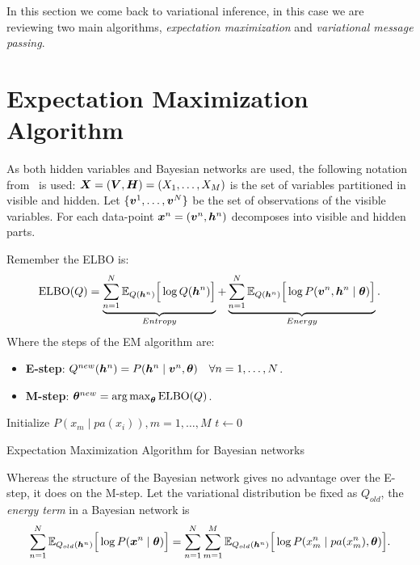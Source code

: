 
In this section we come back to variational inference, in this case we are reviewing two main algorithms, \emph{expectation maximization} and \emph{variational message passing}.


\section{Expectation Maximization Algorithm}

As both hidden variables and Bayesian networks are used, the following notation from~\cite{barber} is used: \(\bm{X} = (\bm{V}, \bm{H}) = (X_{1}, \dots , X_{M})\) is the set of variables partitioned in visible and hidden. Let \(\{\bm{v}^{1}, \dots, \bm{v}^{N}\}\) be the set of observations of the visible variables. For each data-point \(\bm{x}^{n} = (\bm{v}^{n}, \bm{h}^{n})\) decomposes into visible and hidden parts.

Remember the ELBO is:
\[
  \text{ELBO}(Q) = \underbrace{\sum_{n=1}^{N}\mathbb{E}_{Q(\bm{h}^{n})}\Big[\log{Q(\bm{h}^{n})}\Big]}_{Entropy} + \underbrace{\sum_{n=1}^{N}\mathbb{E}_{Q(\bm{h}^{n})}\Big[\log{P(\bm{v}^{n}, \bm{h}^{n} \mid \bm{\theta})}\Big]}_{Energy}.
\]
Where the steps of the EM algorithm are:
\begin{itemize}
  \item \textbf{E-step}:  \(Q^{new}(\bm{h}^{n}) = P(\bm{h}^{n} \mid \bm{v}^{n} , \bm{\theta}) \quad \forall n=1,\dots,N\).
  \item \textbf{M-step}: \(\bm{\theta}^{new} = \operatorname*{arg\,max}_{\bm{\theta}} \text{ELBO}(Q)\).
\end{itemize}

\begin{algorithm}[ht]
  \SetAlgoLined{}
  Initialize \( P(x_{m}\mid pa(x_{i})), m=1,\dots,M \)\;
  \(t \leftarrow 0\)\;
  \;
  \caption{Expectation Maximization Algorithm for Bayesian networks}\label{alg:em_bn}
\end{algorithm}


Whereas the structure of the Bayesian network gives no advantage over the E-step, it does on the M-step. Let the variational distribution be fixed as \(Q_{old}\), the \emph{energy term} in a Bayesian network is
\[
  \sum_{n=1}^{N} \mathbb{E}_{Q_{old}(\bm{h}^{n})}\Big[ \log{P(\bm{x}^{n} \mid \bm{\theta})} \Big] = \sum_{n = 1}^{N}\sum_{m = 1}^{M} \mathbb{E}_{Q_{old}(\bm{h}^{n})}\Big[\log{P( x_{m}^{n} \mid pa(x_{m}^{n}), \bm{\theta})}\Big].
\]

